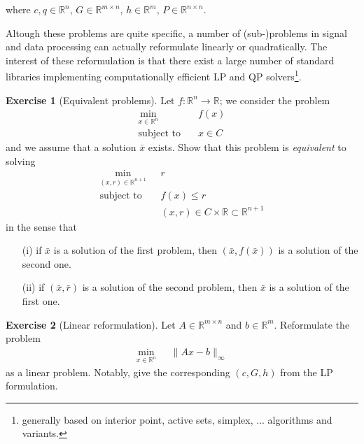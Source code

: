 \documentclass[a4paper,twoside,10pt]{amsart}
\numberwithin{equation}{section} %
\numberwithin{figure}{section} %
\numberwithin{table}{section} %
\theoremstyle{definition}
\newtheorem{q_td}{Exercise }
\begin{document}
\vspace*{0.5cm}


where $c,q\in\mathbb{R}^n$, $G\in\mathbb{R}^{m\times n}$, $ h\in\mathbb{R}^m$, $P\in\mathbb{R}^{n\times n}$.

\vspace*{0.5cm}

Altough these problems are quite specific, a number of (sub-)problems in signal and data processing can actually reformulate linearly or quadratically. The interest of these reformulation is that there exist a large number of standard libraries implementing computationally efficient LP and QP solvers\footnote{generally based on interior point, active sets, simplex, ... algorithms and variants.}.


\vspace*{0.5cm}



\begin{q_td}[Equivalent problems]\label{td:eq}
Let $f:\mathbb{R}^n\to\mathbb{R}$; we consider the problem
\begin{align*}
\min_{x\in\mathbb{R}^n}  & ~~~ f(x)  \\
\text{subject to } & ~~~ x \in C 
\end{align*}
and we assume that a solution $\bar{x}$ exists. Show that this problem is \emph{equivalent} to solving 
\begin{align*}
\min_{(x,r)\in\mathbb{R}^{n+1}}  & ~~~ r  \\
\text{subject to } & ~~~ f(x) \leq r \\
 & ~~~ (x,r)\in C \times \mathbb{R} \subset \mathbb{R}^{n+1} 
\end{align*}
in the sense that
\begin{itemize}
\item[(i)] if $\bar{x}$ is a solution of the first problem, then $(\bar{x}, f (\bar{x}))$ is a solution of the second one.
\item[(ii)] if $(\bar{x},\bar{r})$ is a solution of the second problem, then $\bar{x}$ is a solution of the first one.
\end{itemize}

\end{q_td}

\vspace*{0.5cm}


\begin{q_td}[Linear reformulation]\label{td:ref}
Let $A\in\mathbb{R}^{m\times n}$ and $ b\in\mathbb{R}^m$. Reformulate the problem 
\begin{align*}
\min_{x\in\mathbb{R}^n}  & ~~~ \|Ax-b\|_\infty 
\end{align*}
as a linear problem. Notably, give the corresponding $(c,G,h)$ from the LP formulation.

\end{q_td}
\end{document}
